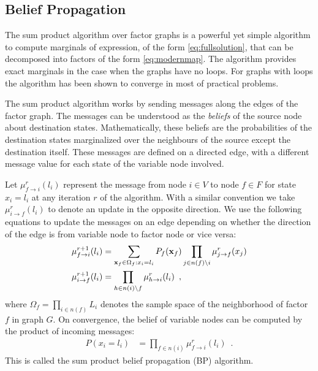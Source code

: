 \documentclass[letterpaper, 10 pt, conference]{ieeeconf} %
\begin{document}
\subsection{Belief Propagation}
\newcommand{\bpmsg}[4]{\mu^{#4}_{#1\rightarrow#2}(#3)}
The sum product algorithm over factor graphs \cite{kschischang2001factor} is a
powerful yet simple algorithm to compute marginals of
expression, of the form \eqref{eq:fullsolution}, that can be decomposed into
factors of the form \eqref{eq:modernmap}. The algorithm provides exact
marginals in the case when the graphs have no loops. For graphs with loops the
algorithm has been shown %
to converge in most of practical problems.
 
The sum product algorithm works by sending messages along the edges of the factor
graph. 
The messages can be understood as the \emph{beliefs} of the source node about
destination states. Mathematically, these beliefs are the probabilities of the
destination states marginalized over the neighbours of the source except the
destination itself.
These messages are
defined on a directed edge, with a different message value for each state of
the variable node involved. 

Let $\bpmsg{f}{i}{l_i}{r}$ represent the message from
node $i \in V$ to node $f \in F$ for state $x_i = l_i$ at any iteration $r$ of the
algorithm. With a similar convention we take $\bpmsg{i}{f}{l_i}{r}$ to denote
an update in the opposite direction. We use the following equations to update
the messages on an edge depending on whether the direction of the edge is from
variable node to factor node or vice versa:
\begin{align}
  \bpmsg{f}{i}{l_i}{r+1} &= \sum_{\map_f \in \Omega_f: x_i = l_i}P_f(\map_f)\prod_{j \in n(f) \setminus i}\bpmsg{j}{f}{x_j}{r}
  \label{eq:factor2node}
  \\
  \bpmsg{i}{f}{l_i}{r+1} &= \prod_{h \in n(i) \setminus f}\bpmsg{h}{i}{l_i}{r}
  \enspace,
  \label{eq:node2factor}
\end{align}
where $\Omega_f = \prod_{i \in n(f)} L_i$ denotes the sample space of the
neighborhood of factor $f$ in graph $G$. On convergence, the belief of variable
nodes can be computed by the product of incoming messages:
\begin{align}
  P(x_i = l_i) &= \prod_{f \in n(i)}\bpmsg{f}{i}{l_i}{r}
  \enspace.
\end{align}
This is called the sum product belief propagation (BP) algorithm.
\end{document}
